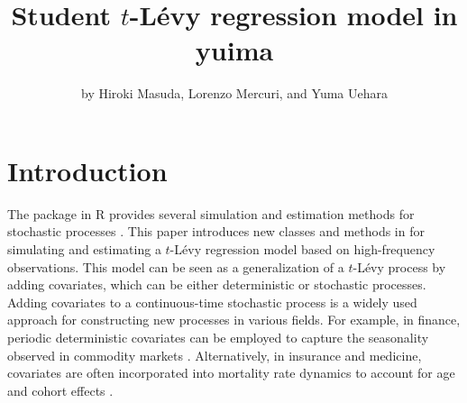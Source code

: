 \title{Student \(t\)-Lévy regression model in yuima}


\author{by Hiroki Masuda, Lorenzo Mercuri, and Yuma Uehara}

\maketitle


\section{Introduction}\label{Intro}

The  package in R provides several simulation and estimation methods for stochastic processes \citep{YUIMA, JSSv057i04, iacus2018simulation}.
This paper introduces new classes and methods in  for simulating and estimating a \(t\)-Lévy regression model based on high-frequency observations. This model can be seen as a generalization of a \(t\)-Lévy process \citep{HeyLeo05, Cuf07} by adding covariates, which can be either deterministic or stochastic processes.
Adding covariates to a continuous-time stochastic process is a widely used approach for constructing new processes in various fields. For example, in finance, periodic deterministic covariates can be employed to capture the seasonality observed in commodity markets \citep{sorensen2002modeling}. Alternatively, in insurance and medicine, covariates are often incorporated into mortality rate dynamics to account for age and cohort effects \citep[see][ and references therein]{HABERMAN2009255, castro2021trends}.

